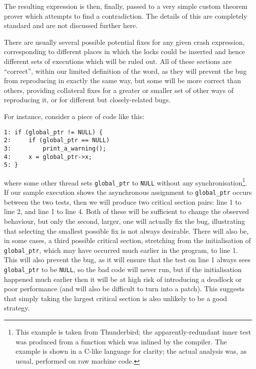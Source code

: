 \documentclass[10pt,a4paper,twocolumn]{article}
\begin{document}
The resulting expression is then, finally, passed to a very simple
custom theorem prover which attempts to find a contradiction.  The
details of this are completely standard and are not discussed further
here.
  

There are usually several possible potential fixes for any given crash
expression, corresponding to different places in which the locks could
be inserted and hence different sets of executions which will be ruled
out.  All of these sections are ``correct'', within our limited
definition of the word, as they will prevent the bug from reproducing
in exactly the same way, but some will be more correct than others,
providing collateral fixes for a greater or smaller set of other ways
of reproducing it, or for different but closely-related bugs.

For instance, consider a piece of code like this:

\begin{verbatim}
1: if (global_ptr != NULL) {
2:     if (global_ptr == NULL)
3:         print_a_warning();
4:     x = global_ptr->x;
5: }
\end{verbatim}

where some other thread sets \verb|global_ptr| to \verb|NULL| without
any synchronisation\footnote{This example is taken from Thunderbird;
  the apparently-redundant inner test was produced from a function
  which was inlined by the compiler.  The example is shown in a C-like
  language for clarity; the actual analysis was, as usual, performed
  on raw machine code.}.  If our sample execution shows the
asynchronous assignment to \verb|global_ptr| occurs between the two
tests, then we will produce two critical section pairs: line 1 to line
2, and line 1 to line 4.  Both of these will be sufficient to change
the observed behaviour, but only the second, larger, one will actually
fix the bug, illustrating that selecting the smallest possible fix is
not always desirable.  There will also be, in some cases, a third
possible critical section, stretching from the initialisation of
\verb|global_ptr|, which may have occurred much earlier in the
program, to line 1.  This will also prevent the bug, as it will ensure
that the test on line 1 always sees \verb|global_ptr| to be
\verb|NULL|, so the bad code will never run, but if the initialisation
happened much earlier then it will be at high risk of introducing a
deadlock or poor performance (and will also be difficult to turn into
a patch).  This suggests that simply taking the largest critical
section is also unlikely to be a good strategy.
\end{document}
